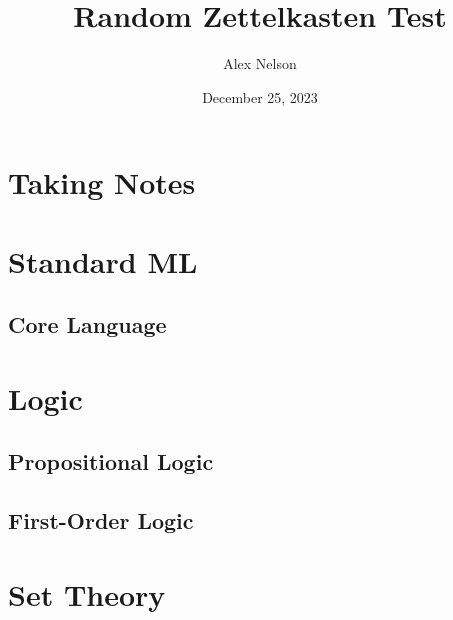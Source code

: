 \documentclass[dvipsnames,HTML,oneside]{amsbook}%
\title{Random Zettelkasten Test}
\author{Alex Nelson}
\date{December 25, 2023}
\begin{document}
\frontmatter
\maketitle
\tableofcontents
\mainmatter
\vfill\eject
\chapter{Taking Notes}


\chapter{Standard ML}

\section{Core Language}


\chapter{Logic}
\section{Propositional Logic}

\section{First-Order Logic}


\chapter{Set Theory}



\backmatter
\nocite{*}

\end{document}

